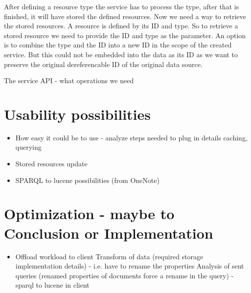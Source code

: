 After defining a resource type the service has to process the type, after that is finished, it will have stored the defined resources. Now we need a way to retrieve the stored resources. A resource is defined by its ID and type. So to retrieve a stored resource we need to provide the ID and type as the parameter.
An option is to combine the type and the ID into a new ID in the scope of the created service. But this could not be embedded into the data as its ID as we want to preserve the original dereferencable ID of the original data source.



The service API - what operations we need

\section{Usability possibilities}
\begin{itemize}
	\item How easy it could be to use - analyze steps needed to plug in details caching, querying
	\item Stored resources update
	\item SPARQL to lucene possibilities (from OneNote)
\end{itemize}


\section{Optimization - maybe to Conclusion or Implementation}
\begin{itemize}
	\item Offload workload to client
		\subitem Transform of data (required storage implementation details) - i.e. have to rename the properties
		\subitem Analysis of sent queries (renamed properties of documents force a rename in the query) - sparql to lucene in client
\end{itemize}
